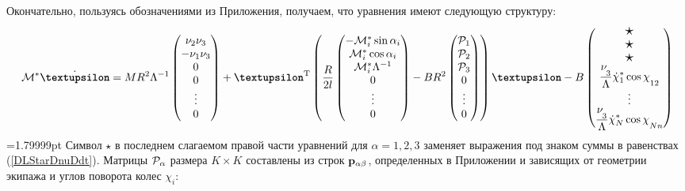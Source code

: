 Окончательно, пользуясь обозначениями из Приложения, получаем, что уравнения имеют следующую структуру:
\begin{eqnarray*}
\M^*\dot{\vnu} = 
MR^2\Lambda^{-1}\left(\begin{matrix}
    \nu_2\nu_3\\
    -\nu_1\nu_3\\
    0\\
    0\\
    \vdots
    \\
    0
\end{matrix}\right)
+\vnu^\mathrm{T}\left(
\frac{R}{2l}
\left(\begin{matrix}
    -\M^*_i \sin\alpha_i\\
    \M^*_i \cos\alpha_i\\
    \M^*_i \Lambda^{-1}\\
    0\\
    \vdots
    \\
    0
    \end{matrix}
\right)
-BR^2
\left(\begin{matrix}
    \Prhs_1\\
    \Prhs_2\\
    \Prhs_3\\
    0\\
    \vdots
    \\
    0
\end{matrix}\right)
\right)
\vnu
-B\left(\begin{matrix}
    \scalebox{1.5}{$\star$}\\
    \scalebox{1.5}{$\star$}\\
    \scalebox{1.5}{$\star$}\\
    \fontdimen16\textfont2=5pt
    \ddfrac{\nu_3}{\Lambda}\dot{\chi}_1^*\cos\chi_{12}\\
    \vdots
    \\
    \ddfrac{\nu_3}{\Lambda}\dot{\chi}_N^*\cos\chi_{Nn}
\end{matrix}\right)
\end{eqnarray*}
\begin{equation}\label{eq:full_system}
\end{equation}
=1.79999pt
Символ $\star$ в последнем слагаемом правой части уравнений для $\alpha = 1,2,3 $ заменяет выражения под знаком суммы в равенствах (\ref{DLStarDnuDdt}). Матрицы $\mathcal{P}_\alpha$ размера $K\times K$ составлены из строк $\mathbf{p}_{\alpha\beta}$, определенных в Приложении и зависящих от геометрии экипажа и углов поворота колес $\chi_i$:
